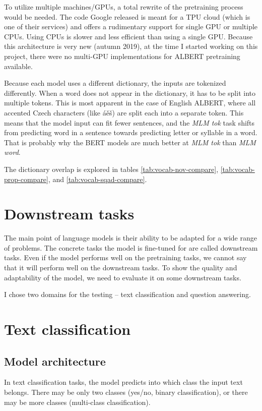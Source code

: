 \documentclass[
  printed, %
  color,   %
  table,   %
  oneside, %
  lof,     %
  lot,     %
]{fithesis3}
\begin{document}
To utilize multiple machines/GPUs, a total rewrite of the pretraining process would be needed. The code Google released is meant for a TPU cloud (which is one of their services) and offers a rudimentary support for single GPU or multiple CPUs. Using CPUs is slower and less efficient than using a single GPU. Because this architecture is very new (autumn 2019), at the time I started working on this project, there were no multi-GPU implementations for ALBERT pretraining available.

Because each model uses a different dictionary, the inputs are tokenized differently. When a word does not appear in the dictionary, it has to be split into multiple tokens. This is most apparent in the case of English ALBERT, where all accented Czech characters (like áěš) are split each into a separate token. This means that the model input can fit fewer sentences, and the \textit{MLM tok} task shifts from predicting word in a sentence towards predicting letter or syllable in a word. That is probably why the BERT models are much better at \textit{MLM tok} than \textit{MLM word}.  


The dictionary overlap is explored in tables \ref{tab:vocab-nov-compare}, \ref{tab:vocab-prop-compare}, and \ref{tab:vocab-sqad-compare}.

\clearpage
\section{Downstream tasks}
The main point of language models is their ability to be adapted for a wide range of problems. The concrete tasks the model is fine-tuned for are called downstream tasks. Even if the model performs well on the pretraining tasks, we cannot say that it will perform well on the downstream tasks. To show the quality and adaptability of the model, we need to evaluate it on some downstream tasks.

I chose two domains for the testing -- text classification and question answering.

\section{Text classification}
\subsection{Model architecture}
In text classification tasks, the model predicts into which class the input text belongs. There may be only two classes (yes/no, binary classification), or there may be more classes (multi-class classification).
\end{document}
